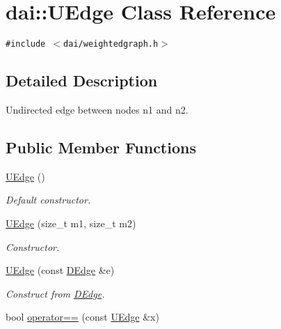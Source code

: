 \hypertarget{classdai_1_1UEdge}{
\section{dai::UEdge Class Reference}
\label{classdai_1_1UEdge}
}
{\tt \#include $<$dai/weightedgraph.h$>$}



\subsection{Detailed Description}
Undirected edge between nodes n1 and n2. \subsection*{Public Member Functions}
\begin{CompactItemize}
\item 
\hypertarget{classdai_1_1UEdge_42ec52c9396a94aafd7fd62a9b36067e}{
\hyperlink{classdai_1_1UEdge_42ec52c9396a94aafd7fd62a9b36067e}{UEdge} ()}
\label{classdai_1_1UEdge_42ec52c9396a94aafd7fd62a9b36067e}

\begin{CompactList}\small\item\em Default constructor. \item\end{CompactList}\item 
\hypertarget{classdai_1_1UEdge_1e7819b6b776d0715207b251a8c951fe}{
\hyperlink{classdai_1_1UEdge_1e7819b6b776d0715207b251a8c951fe}{UEdge} (size\_\-t m1, size\_\-t m2)}
\label{classdai_1_1UEdge_1e7819b6b776d0715207b251a8c951fe}

\begin{CompactList}\small\item\em Constructor. \item\end{CompactList}\item 
\hypertarget{classdai_1_1UEdge_31d68730f49619179aff649cbe5c3d3d}{
\hyperlink{classdai_1_1UEdge_31d68730f49619179aff649cbe5c3d3d}{UEdge} (const \hyperlink{classdai_1_1DEdge}{DEdge} \&e)}
\label{classdai_1_1UEdge_31d68730f49619179aff649cbe5c3d3d}

\begin{CompactList}\small\item\em Construct from \hyperlink{classdai_1_1DEdge}{DEdge}. \item\end{CompactList}\item 
\hypertarget{classdai_1_1UEdge_6104711a37099d2bea16ebc26f35592d}{
bool \hyperlink{classdai_1_1UEdge_6104711a37099d2bea16ebc26f35592d}{operator==} (const \hyperlink{classdai_1_1UEdge}{UEdge} \&x)}
\label{classdai_1_1UEdge_6104711a37099d2bea16ebc26f35592d}


\end{CompactItemize}
